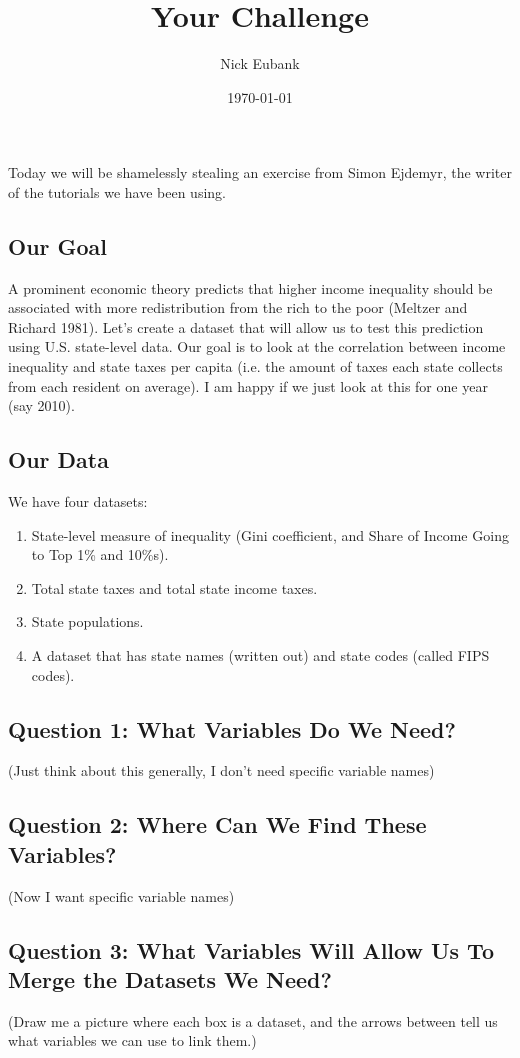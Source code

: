 \documentclass[12pt]{article}
\title{Your Challenge}
\author{Nick Eubank}
\date{\today}
\begin{document}
\maketitle

Today we will be shamelessly stealing an exercise from Simon Ejdemyr, the writer of the tutorials we have been using.

\subsection*{Our Goal}

A prominent economic theory predicts that higher income inequality should be associated with more redistribution from the rich to the poor (Meltzer and Richard 1981). Let’s create a dataset that will allow us to test this prediction using U.S. state-level data. Our goal is to look at the correlation between income inequality and state taxes per capita (i.e. the amount of taxes each state collects from each resident on average). I am happy if we just look at this for one year (say 2010).

\subsection*{Our Data}

We have four datasets:
\begin{enumerate}
    \item State-level measure of inequality (Gini coefficient, and Share of Income Going to Top 1\% and 10\%s).
    \item Total state taxes and total state income taxes.
    \item State populations.
    \item A dataset that has state names (written out) and state codes (called FIPS codes).
\end{enumerate}

\subsection*{Question 1: What Variables Do We Need?}
(Just think about this generally, I don't need specific variable names)

\vspace*{4cm}


\subsection*{Question 2: Where Can We Find These Variables?}
(Now I want specific variable names)

\vspace*{4cm}


\subsection*{Question 3: What Variables Will Allow Us To Merge the Datasets We Need?}
(Draw me a picture where each box is a dataset, and the arrows between tell us what variables we can use to link them.)
\end{document}
